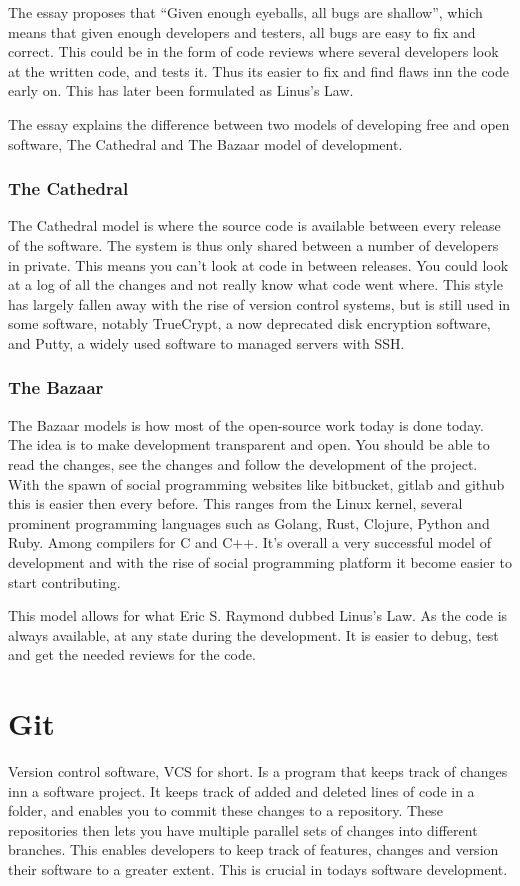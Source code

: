 \documentclass[12pt]{article}
\begin{document}
The essay proposes that ``Given enough eyeballs, all bugs are shallow'', which
means that given enough developers and testers, all bugs are easy to fix and
correct. This could be in the form of code reviews where several developers look
at the written code, and tests it. Thus its easier to fix and find flaws inn the
code early on. This has later been formulated as Linus's Law.

The essay explains the difference between two models of developing free and open
software, The Cathedral and The Bazaar model of development.

\subsubsection{The Cathedral}
The Cathedral model is where the source code is available between every release
of the software. The system is thus only shared between a number of developers
in private. This means you can't look at code in between releases. You could
look at a log of all the changes and not really know what code went where. This
style has largely fallen away with the rise of version control systems, but is
still used in some software, notably TrueCrypt, a now deprecated disk encryption
software, and Putty, a widely used software to managed servers with SSH.


\subsubsection{The Bazaar}
The Bazaar models is how most of the open-source work today is done today. The
idea is to make development transparent and open. You should be able to read the
changes, see the changes and follow the development of the project. With the
spawn of social programming websites like bitbucket, gitlab and github this is
easier then every before.  This ranges from the Linux kernel, several prominent
programming languages such as Golang, Rust, Clojure, Python and Ruby. Among
compilers for C and C++. It's overall a very successful model of development
and with the rise of social programming platform it become easier to start
contributing.

This model allows for what Eric S. Raymond dubbed Linus's Law. As the code is
always available, at any state during the development. It is easier to debug,
test and get the needed reviews for the code.


\section{Git} 
Version control software, VCS for short. Is a program that keeps track of
changes inn a software project. It keeps track of added and deleted lines of
code in a folder, and enables you to commit these changes to a repository. These
repositories then lets you have multiple parallel sets of changes into different
branches. This enables developers to keep track of features, changes and version
their software to a greater extent. This is crucial in todays software
development.
\end{document}
